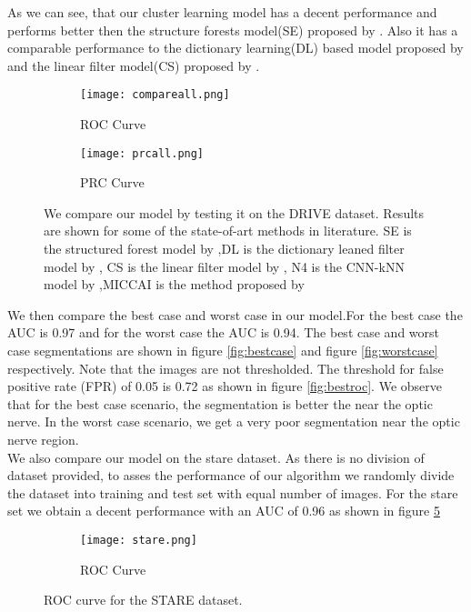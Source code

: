 As we can see, that our cluster learning model has a decent performance and performs better then the structure forests model(SE) proposed by \citet{dollar2013structured}. Also it has a comparable performance to the dictionary learning(DL) based model proposed by \citet{rigamonti2013learning}  and the linear filter model(CS) proposed by \citet{rigamonti2012accurate}.\\

\begin{figure}
	\centering
	
	\begin{subfigure}[b]{0.75\textwidth}
		\texttt{[image: compareall.png]}
		\caption{ROC Curve}
		\label{fig:com}
	\end{subfigure}
	\begin{subfigure}[b]{0.75\textwidth}
		\texttt{[image: prcall.png]}
		\caption{PRC Curve}
		\label{fig:prc1}
	\end{subfigure}
	\caption[Results on DRIVE dataset]{We compare our model by testing it on the DRIVE dataset. Results are shown for some of the state-of-art methods in literature. SE is the structured forest model by \citet{dollar2013structured},DL is the dictionary leaned filter model by \citet{rigamonti2013learning}, CS is the linear filter model by \citet{rigamonti2012accurate}, N4 is the CNN-kNN model by \citet{ganin2014n},MICCAI is the method proposed by \citet{becker2013supervised}}
	\label{fig:compareall}

\end{figure}
We then compare the best case and worst case in our model.For the best case the AUC is 0.97 and for the worst case the AUC is 0.94. The best case and worst case segmentations are shown in figure \ref{fig:bestcase} and figure \ref{fig:worstcase} respectively. Note that the images are not thresholded. The threshold for false positive rate (FPR) of 0.05 is 0.72 as shown in figure \ref{fig:bestroc}. We observe that for the best case scenario, the segmentation is better the near the optic nerve. In the worst case scenario, we get a very poor segmentation near the optic nerve region.\\

We also compare our model on the stare dataset. As there is no division of dataset provided, to asses the performance of our algorithm we randomly divide the dataset into training and test set with equal number of images. For the stare set we obtain a decent performance with an AUC of 0.96 as shown in figure \ref{fig:stare}
\begin{figure}
	\centering
	
	\begin{subfigure}[b]{0.75\textwidth}
		\texttt{[image: stare.png]}
		\caption{ROC Curve}
		\label{fig:stare1}
	\end{subfigure}
	\caption[ROC curve on a train test split of STARE dataset]{ROC curve for the STARE dataset.}
	\label{fig:stare}
\end{figure}

